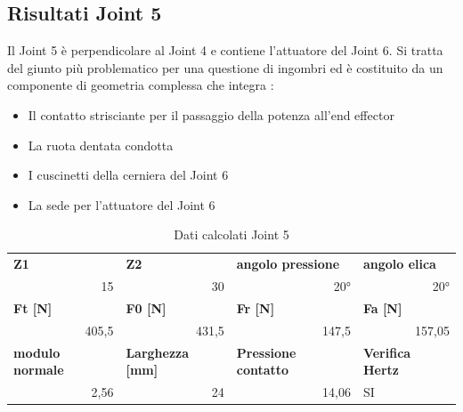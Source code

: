 \documentclass[%
corpo=11pt,
twoside,
 stile=classica,
oldstyle,
greek,%
]{toptesi}
\begin{document}
		\subsection{Risultati Joint 5}
		Il Joint 5 è perpendicolare al Joint 4 e contiene l'attuatore del Joint 6. Si tratta del giunto più problematico per una questione di ingombri ed è costituito da un componente di geometria complessa che integra :
		\begin{itemize}
			\item Il contatto strisciante per il passaggio della potenza all'end effector
			\item La ruota dentata condotta
			\item I cuscinetti della cerniera del Joint 6 
			\item La sede per l'attuatore del Joint 6 
		\end{itemize}
		
		\begin{table}[H]
			\centering
			\caption{Dati calcolati Joint 5}
			\begin{tabular}{rrrl}
				\multicolumn{1}{l}{\textbf{Z1}} & \multicolumn{1}{l}{\textbf{Z2}} & \multicolumn{1}{l}{\textbf{angolo pressione}} & \textbf{angolo elica} \\
				15    & 30    & 20°    & \multicolumn{1}{r}{20°} \\
				\multicolumn{1}{l}{\textbf{Ft [N]}} & \multicolumn{1}{l}{\textbf{F0 [N]}} & \multicolumn{1}{l}{\textbf{Fr [N]}} & \textbf{Fa [N]} \\
				405,5 & 431,5 & 147,5 & \multicolumn{1}{r}{157,05} \\
				\multicolumn{1}{l}{\textbf{modulo normale}} & \multicolumn{1}{l}{\textbf{Larghezza [mm]}} & \multicolumn{1}{l}{\textbf{Pressione contatto}} & \textbf{Verifica Hertz} \\
				2,56 & 24    & 14,06  & SI \\
			\end{tabular}%
			\label{tab:lewis2}%
		\end{table}%
	
\end{document}
